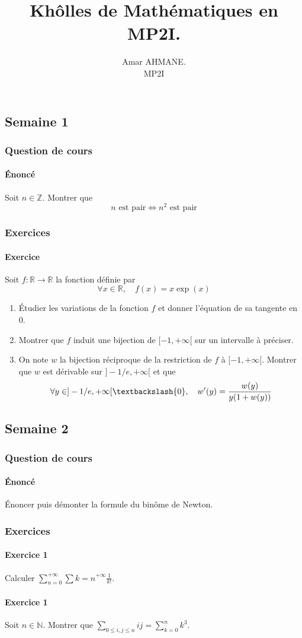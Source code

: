 \documentclass[10pt]{article}
\title{\Huge\textbf{Khôlles de Mathématiques en MP2I.}}
\author{Amar AHMANE.\\ MP2I}
\date{}
\def\N{\mathbb N}
\def\Z{\mathbb Z}
\def\R{\mathbb R}
\def\Ssi{\Longleftrightarrow}
\begin{document}
    \maketitle

    \subsection*{Semaine 1}
    \subsubsection*{Question de cours}
    \paragraph{Énoncé} Soit $n\in\Z$. Montrer que \[n\text{ est pair}\Ssi n^2\text{ est pair}\]

    \subsubsection*{Exercices}
    \paragraph{Exercice} Soit $f:\R\to\R$ la fonction définie par \[\forall x\in\R,\quad f(x)=x\exp(x)\]
    \begin{enumerate}
        \item Étudier les variations de la fonction $f$ et donner l'équation de sa tangente en $0$.
        \item Montrer que $f$ induit une bijection de $[-1,+\infty[$ sur un intervalle à préciser.
        \item On note $w$ la bijection réciproque de la restriction de $f$ à $[-1,+\infty[$. Montrer que $w$ est dérivable sur $]-1/e,+\infty[$ et que \[\forall y\in]-1/e,+\infty[\textbackslash\lbrace 0\rbrace,\quad w^\prime(y)=\frac{w(y)}{y(1+w(y))}\]
    \end{enumerate}

    \subsection*{Semaine 2}
    \subsubsection*{Question de cours}
    \paragraph{Énoncé} Énoncer puis démonter la formule du binôme de Newton.

    \subsubsection*{Exercices}
    \paragraph{Exercice 1} Calculer \(\sum_{n=0}^{+\infty}\sum{k=n}^{+\infty}\frac1{k!}\).

    \paragraph{Exercice 1} Soit $n\in\N$. Montrer que \(\sum_{0\leq i,j \leq n}ij=\sum_{k=0}^nk^3\).
\end{document}
